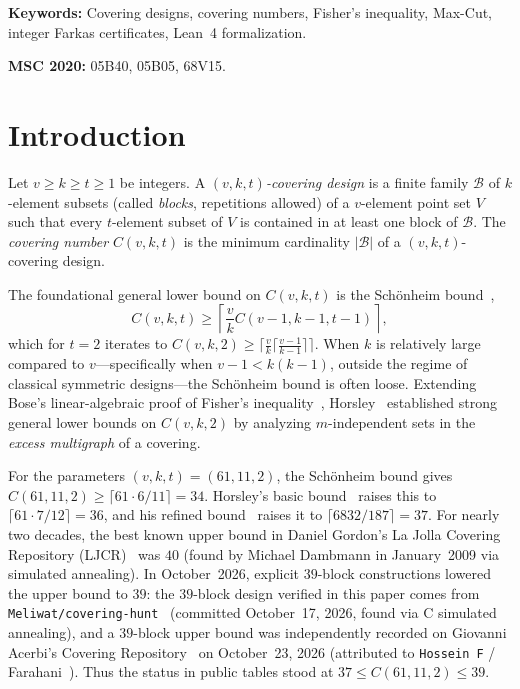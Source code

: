 \documentclass[11pt,a4paper]{article}
\theoremstyle{definition}
\theoremstyle{remark}
\begin{document}
\noindent\textbf{Keywords:} Covering designs, covering numbers, Fisher's inequality, Max-Cut, integer Farkas certificates, Lean~4 formalization.

\noindent\textbf{MSC 2020:} 05B40, 05B05, 68V15.

\section{Introduction}

Let $v \ge k \ge t \ge 1$ be integers. A \emph{$(v,k,t)$-covering design} is a finite family $\mathcal{B}$ of $k$-element subsets (called \emph{blocks}, repetitions allowed) of a $v$-element point set $V$ such that every $t$-element subset of $V$ is contained in at least one block of $\mathcal{B}$. The \emph{covering number} $C(v,k,t)$ is the minimum cardinality $|\mathcal{B}|$ of a $(v,k,t)$-covering design.

The foundational general lower bound on $C(v,k,t)$ is the Sch\"onheim bound~\cite{Schonheim1964},
\begin{equation}\label{eq:schonheim}
  C(v,k,t) \ge \left\lceil \frac{v}{k} C(v-1,k-1,t-1) \right\rceil,
\end{equation}
which for $t=2$ iterates to $C(v,k,2) \ge \lceil \frac{v}{k}\lceil \frac{v-1}{k-1}\rceil \rceil$. When $k$ is relatively large compared to $v$—specifically when $v-1 < k(k-1)$, outside the regime of classical symmetric designs—the Sch\"onheim bound is often loose. Extending Bose's linear-algebraic proof of Fisher's inequality~\cite{Fisher1940,Bose1949}, Horsley~\cite{Horsley2017} established strong general lower bounds on $C(v,k,2)$ by analyzing $m$-independent sets in the \emph{excess multigraph} of a covering.

For the parameters $(v,k,t) = (61,11,2)$, the Sch\"onheim bound gives $C(61,11,2) \ge \lceil 61 \cdot 6 / 11 \rceil = 34$. Horsley's basic bound~\cite[Theorem~1]{Horsley2017} raises this to $\lceil 61 \cdot 7 / 12 \rceil = 36$, and his refined bound~\cite[Theorem~4(a)]{Horsley2017} raises it to $\lceil 6832/187 \rceil = 37$. For nearly two decades, the best known upper bound in Daniel Gordon's La Jolla Covering Repository (LJCR)~\cite{GordonLJCR} was $40$ (found by Michael Dambmann in January~2009 via simulated annealing). In October~2026, explicit $39$-block constructions lowered the upper bound to $39$: the $39$-block design verified in this paper comes from \texttt{Meliwat/covering-hunt}~\cite{Meliwat2026} (committed October~17, 2026, found via C simulated annealing), and a $39$-block upper bound was independently recorded on Giovanni Acerbi's Covering Repository~\cite{AcerbiCR} on October~23, 2026 (attributed to \texttt{Hossein F} / Farahani~\cite{Farahani2026}). Thus the status in public tables stood at $37 \le C(61,11,2) \le 39$.
\end{document}
